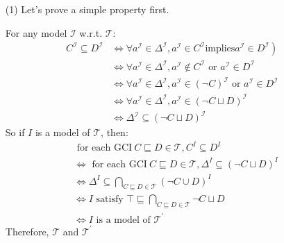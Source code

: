 \documentclass[12pt]{article}
\begin{document}
    \begin{enumerate}
        \item [(1)]
        Let's prove a simple property first. \par
        For any model $\mathcal{I}$ w.r.t. $\mathcal{T}$:
        \begin{equation}
            \begin{aligned}
                C^\mathcal{I} \subseteq D^\mathcal{I} &\Leftrightarrow \forall a^\mathcal{I} \in \Delta^\mathcal{I},a^\mathcal{I} \in C^\mathcal{I} \text{implies} \left.a^\mathcal{I} \in D^\mathcal{I}\right) \\
                & \Leftrightarrow \forall a^\mathcal{I} \in \Delta^\mathcal{I},a^\mathcal{I} \notin C^\mathcal{I} \text { or } a^\mathcal{I} \in D^\mathcal{I} \\
                & \Leftrightarrow \forall a^\mathcal{I} \in \Delta^\mathcal{I},a^\mathcal{I} \in(\neg C)^\mathcal{I} \text { or } a^\mathcal{I} \in D^\mathcal{I} \\
                & \Leftrightarrow \forall a^\mathcal{I} \in \Delta^\mathcal{I}, a^\mathcal{I} \in(\neg C \sqcup D)^\mathcal{I} \\
                & \Leftrightarrow \Delta^\mathcal{I} \subseteq(\neg C \sqcup D)^\mathcal{I}
                \nonumber
                \end{aligned}
        \end{equation}
        So if $I$ is a model of $\mathcal{T}$, then:
        \begin{equation}
            \begin{aligned}
                &\text { for each } \mathrm{GCI}\  C \sqsubseteq D \in \mathcal{T}, C^I \subseteq D^I \\
                & \Leftrightarrow \text { for each } \mathrm{GCI}\  C \sqsubseteq D \in \mathcal{T}, \Delta^I \subseteq(\neg C \sqcup D)^I\\
                & \Leftrightarrow \Delta^I \subseteq \bigcap_{C \sqsubseteq D \in \mathcal{T}}(\neg C \cup D)^I \\
                & \Leftrightarrow I \text { satisfy } \top \sqsubseteq \bigcap_{C \sqsubseteq D \in \mathcal{T}} \neg C \sqcup D \\
                & \Leftrightarrow I \text { is a model of } \mathcal{T}^{\prime}
                \nonumber
                \end{aligned}
        \end{equation}
        Therefore, $\mathcal{T}$ and $\mathcal{T}^{\prime}$

\end{enumerate}
\end{document}
